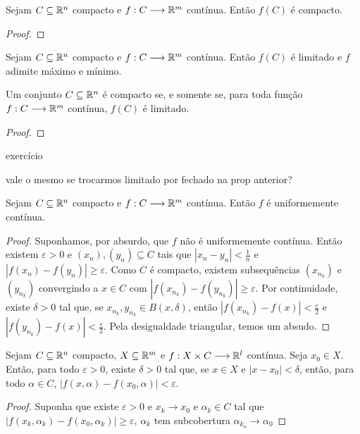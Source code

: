 \begin{teo}
	Sejam $C \subseteq \mathbb{R}^n$ compacto e $f: C \longrightarrow \mathbb{R}^m$ contínua. Então $f(C)$ é compacto.
\end{teo}
\begin{proof}

\end{proof}

\begin{prop}
	Sejam $C \subseteq \mathbb{R}^n$ compacto e $f: C \longrightarrow \mathbb{R}^m$ contínua. Então $f(C)$ é limitado e $f$ adimite máximo e mínimo.
\end{prop}

\begin{prop}
	Um conjunto $C \subseteq \mathbb{R}^n$ é compacto se, e somente se, para toda função $f: C \longrightarrow \mathbb{R}^m$ contínua, $f(C)$ é limitado.
\end{prop}
\begin{proof}

\end{proof}

exercício

vale o mesmo se trocarmos limitado por fechado na prop anterior?


\begin{prop}
	Sejam $C \subseteq \mathbb{R}^n$ compacto e $f: C \longrightarrow \mathbb{R}^m$ contínua. Então $f$ é uniformemente contínua.
\end{prop}
\begin{proof}
	Suponhamos, por absurdo, que $f$ não é uniformemente contínua. Então existem $\varepsilon > 0$ e $(x_n),(y_n) \subseteq C$ tais que $|x_n - y_n| < \frac{1}{n}$ e $|f(x_n)-f(y_n)| \geq \varepsilon$. Como $C$ é compacto, existem subsequências $(x_{n_k})$  e $(y_{n_k})$ convergindo a $x \in C$ com $|f(x_{n_k})-f(y_{n_k})| \geq \varepsilon$. Por continuidade, existe $\delta > 0$ tal que, se $x_{n_k},y_{n_k} \in B(x,\delta)$, então $|f(x_{n_k})-f(x)| < \frac{\varepsilon}{2}$ e $|f(y_{n_k})-f(x)| < \frac{\varepsilon}{2}$. Pela desigualdade triangular, temos um absudo.
\end{proof}

\begin{prop}
	Sejam $C \subseteq \mathbb{R}^n$ compacto, $X \subseteq \mathbb{R}^m$ e $f: X \times C \longrightarrow \mathbb{R}^l$ contínua. Seja $x_0 \in X$. Então, para todo $\varepsilon > 0$, existe $\delta > 0$ tal que, se $x \in X$ e $|x-x_0| < \delta$, então, para todo $\alpha \in C$, $|f(x,\alpha)-f(x_0,\alpha)|<\varepsilon$.
\end{prop}
\begin{proof}
	Suponha que existe $\varepsilon>0$ e $x_k \to x_0$ e $\alpha_k \in C$ tal que $|f(x_k,\alpha_k)-f(x_0, \alpha_k)| \geq \varepsilon$, $\alpha_k$ tem subcobertura $\alpha_{k_n} \to \alpha_0$
\end{proof}











